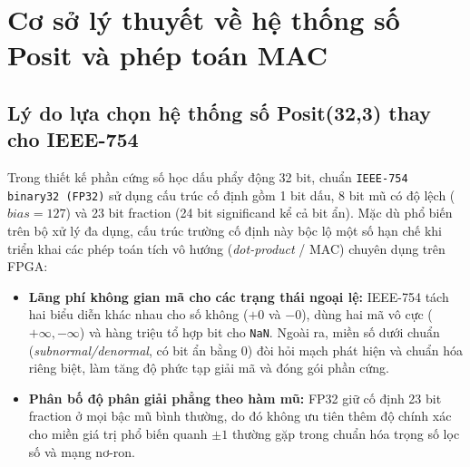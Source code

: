 \chapter{Cơ sở lý thuyết về hệ thống số Posit và phép toán MAC}
\label{ch:arithmetic}

\section{Lý do lựa chọn hệ thống số Posit(32,3) thay cho IEEE-754}

Trong thiết kế phần cứng số học dấu phẩy động 32 bit, chuẩn
\texttt{IEEE-754 binary32 (FP32)} \cite{ieee754_2019} sử dụng cấu trúc cố định
gồm 1 bit dấu, 8 bit mũ có độ lệch ($bias=127$) và 23 bit fraction (24 bit
significand kể cả bit ẩn). Mặc dù phổ biến trên bộ xử lý đa dụng, cấu trúc
trường cố định này bộc lộ một số hạn chế khi triển khai các phép toán tích vô
hướng (\textit{dot-product} / MAC) chuyên dụng trên FPGA:
\begin{itemize}
  \item \textbf{Lãng phí không gian mã cho các trạng thái ngoại lệ:} IEEE-754 tách
        hai biểu diễn khác nhau cho số không ($+0$ và $-0$), dùng hai mã vô cực
        ($+\infty, -\infty$) và hàng triệu tổ hợp bit cho \texttt{NaN}. Ngoài ra,
        miền số dưới chuẩn (\textit{subnormal/denormal}, có bit ẩn bằng 0) đòi
        hỏi mạch phát hiện và chuẩn hóa riêng biệt, làm tăng độ phức tạp giải mã
        và đóng gói phần cứng.
  \item \textbf{Phân bố độ phân giải phẳng theo hàm mũ:} FP32 giữ cố định 23 bit
        fraction ở mọi bậc mũ bình thường, do đó không ưu tiên thêm độ chính xác
        cho miền giá trị phổ biến quanh $\pm 1$ thường gặp trong chuẩn hóa trọng
        số lọc số và mạng nơ-ron.
\end{itemize}

